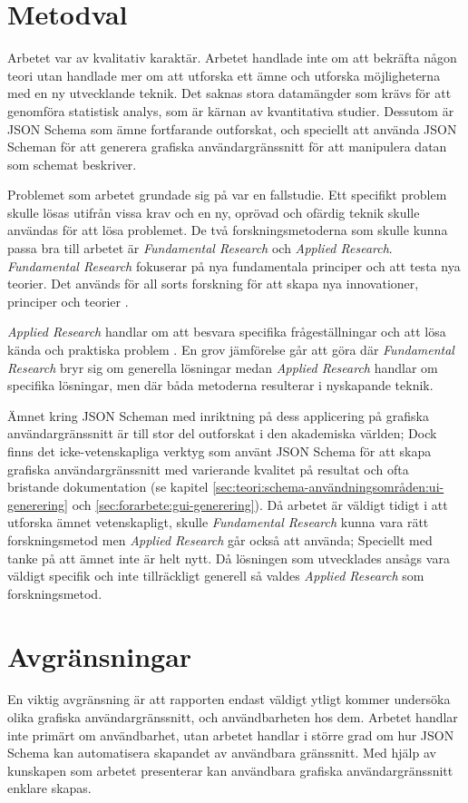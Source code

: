 \section{Metodval}
\label{sec:intro:metodval}

Arbetet var av kvalitativ karaktär. Arbetet handlade inte om att bekräfta någon teori utan handlade mer om att utforska ett ämne och utforska möjligheterna med en ny utvecklande teknik. Det saknas stora datamängder som krävs för att genomföra statistisk analys, som är kärnan av kvantitativa studier. Dessutom är JSON Schema som ämne fortfarande outforskat, och speciellt att använda JSON Scheman för att generera grafiska användargränssnitt för att manipulera datan som schemat beskriver.

Problemet som arbetet grundade sig på var en fallstudie. Ett specifikt problem skulle lösas utifrån vissa krav och en ny, oprövad och ofärdig teknik skulle användas för att lösa problemet. De två forskningsmetoderna som skulle kunna passa bra till arbetet är \textit{Fundamental Research} och \textit{Applied Research}. \textit{Fundamental Research} fokuserar på nya fundamentala principer och att testa nya teorier. Det används för all sorts forskning för att skapa nya innovationer, principer och teorier \cite{Hakansson}.

\textit{Applied Research} handlar om att besvara specifika frågeställningar och att lösa kända och praktiska problem \cite{Hakansson}. En grov jämförelse går att göra där \textit{Fundamental Research} bryr sig om generella lösningar medan \textit{Applied Research} handlar om specifika lösningar, men där båda metoderna resulterar i nyskapande teknik.

Ämnet kring JSON Scheman med inriktning på dess applicering på grafiska användargränssnitt är till stor del outforskat i den akademiska världen; Dock finns det icke-vetenskapliga verktyg som använt JSON Schema för att skapa grafiska användargränssnitt med varierande kvalitet på resultat och ofta bristande dokumentation (se kapitel \ref{sec:teori:schema-användningsområden:ui-generering} och \ref{sec:forarbete:gui-generering}). Då arbetet är väldigt tidigt i att utforska ämnet vetenskapligt, skulle \textit{Fundamental Research} kunna vara rätt forskningsmetod men \textit{Applied Research} går också att använda; Speciellt med tanke på att ämnet inte är helt nytt. Då lösningen som utvecklades ansågs vara väldigt specifik och inte tillräckligt generell så valdes \textit{Applied Research} som forskningsmetod.

\section{Avgränsningar}
\label{sec:intro:avgränsningar}
En viktig avgränsning är att rapporten endast väldigt ytligt kommer undersöka olika grafiska användargränssnitt, och användbarheten hos dem. Arbetet handlar inte primärt om användbarhet, utan arbetet handlar i större grad om hur JSON Schema kan automatisera skapandet av användbara gränssnitt. Med hjälp av kunskapen som arbetet presenterar kan användbara grafiska användargränssnitt enklare skapas.

